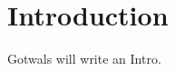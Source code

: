 \documentclass[11pt,fleqn]{book} %
\begin{document}
\pagestyle{empty} %

\tableofcontents %


\pagestyle{fancy} %



\chapter{Introduction}

Gotwals will write an Intro.


\printbibliography
\end{document}
